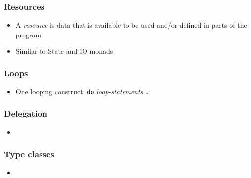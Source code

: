 \documentclass[12pt]{beamer}
\begin{document}
\begin{frame}
\frametitle{Resources}
\begin{itemize}
\item A \emph{resource} is data that is available to be used and/or
  defined in parts of the program
\item Similar to State and IO monads
\end{itemize}
\end{frame}


\begin{frame}
\frametitle{Loops}
\begin{itemize}
\item One looping construct: \texttt{do} \emph{loop-statements} \ldots
\end{itemize}
\end{frame}


\begin{frame}
\frametitle{Delegation}
\begin{itemize}
\item 
\end{itemize}
\end{frame}


\begin{frame}
\frametitle{Type classes}
\begin{itemize}
\item 
\end{itemize}
\end{frame}
\end{document}
